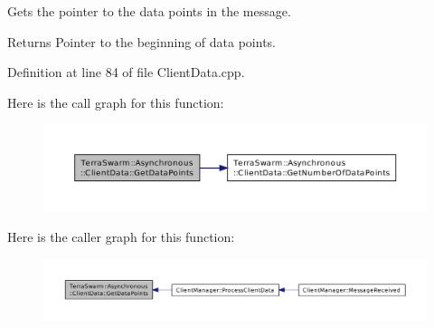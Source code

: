 Gets the pointer to the data points in the message. 

\begin{DoxyReturn}{Returns}
Pointer to the beginning of data points. 
\end{DoxyReturn}


Definition at line 84 of file Client\-Data.\-cpp.



Here is the call graph for this function\-:\nopagebreak
\begin{figure}[H]
\begin{center}
\leavevmode
\includegraphics[width=350pt]{class_terra_swarm_1_1_asynchronous_1_1_client_data_a72ed5a08a0bbe088b3b6f4d79cdbab2d_cgraph}
\end{center}
\end{figure}




Here is the caller graph for this function\-:\nopagebreak
\begin{figure}[H]
\begin{center}
\leavevmode
\includegraphics[width=350pt]{class_terra_swarm_1_1_asynchronous_1_1_client_data_a72ed5a08a0bbe088b3b6f4d79cdbab2d_icgraph}
\end{center}
\end{figure}


